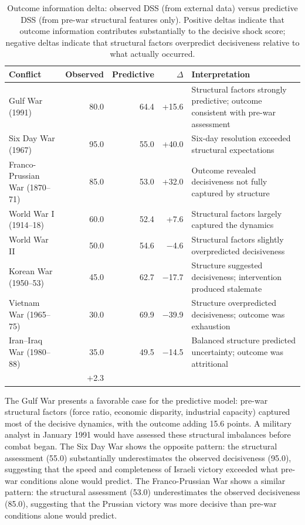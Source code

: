 \begin{table}[ht]
\centering
\caption{Outcome information delta: observed DSS (from external data) versus predictive DSS (from pre-war structural features only). Positive deltas indicate that outcome information contributes substantially to the decisive shock score; negative deltas indicate that structural factors overpredict decisiveness relative to what actually occurred.}
\label{tab:outcome_delta}
\begin{tabularx}{\textwidth}{@{}>{\RaggedRight\arraybackslash}p{} r r r >{\RaggedRight\arraybackslash}X@{}}
\toprule
\textbf{Conflict} & \textbf{Observed} & \textbf{Predictive} & \textbf{$\Delta$} & \textbf{Interpretation} \\
\midrule
Gulf War (1991) & 80.0 & 64.4 & +15.6 & Structural factors strongly predictive; outcome consistent with pre-war assessment \\
Six Day War (1967) & 95.0 & 55.0 & +40.0 & Six-day resolution exceeded structural expectations \\
Franco-Prussian War (1870--71) & 85.0 & 53.0 & +32.0 & Outcome revealed decisiveness not fully captured by structure \\
World War I (1914--18) & 60.0 & 52.4 & +7.6 & Structural factors largely captured the dynamics \\
World War II & 50.0 & 54.6 & $-$4.6 & Structural factors slightly overpredicted decisiveness \\
Korean War (1950--53) & 45.0 & 62.7 & $-$17.7 & Structure suggested decisiveness; intervention produced stalemate \\
Vietnam War (1965--75) & 30.0 & 69.9 & $-$39.9 & Structure overpredicted decisiveness; outcome was exhaustion \\
Iran--Iraq War (1980--88) & 35.0 & 49.5 & $-$14.5 & Balanced structure predicted uncertainty; outcome was attritional \\
\midrule
\multicolumn{4}{l}{\textbf{Mean}} & $+$2.3 \\
\bottomrule
\end{tabularx}
\end{table}

The Gulf War presents a favorable case for the predictive model: pre-war structural factors (force ratio, economic disparity, industrial capacity) captured most of the decisive dynamics, with the outcome adding 15.6 points. A military analyst in January 1991 would have assessed these structural imbalances before combat began. The Six Day War shows the opposite pattern: the structural assessment (55.0) substantially underestimates the observed decisiveness (95.0), suggesting that the speed and completeness of Israeli victory exceeded what pre-war conditions alone would predict. The Franco-Prussian War shows a similar pattern: the structural assessment (53.0) underestimates the observed decisiveness (85.0), suggesting that the Prussian victory was more decisive than pre-war conditions alone would predict.

